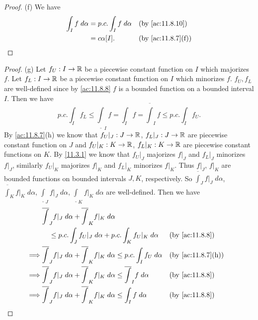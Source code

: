 \begin{proof}{(f)}
  We have
  \begin{align*}
    \int_I f \; d \alpha & = p.c. \int_I f \; d \alpha &  & \text{(by \cref{ac:11.8.10})}   \\
                         & = c \alpha[I].              &  & \text{(by \cref{ac:11.8.7}(f))}
  \end{align*}
\end{proof}

\begin{proof}{(g)}
  Let \(f_U : I \to \mathbb{R}\) be a piecewise constant function on \(I\) which majorizes \(f\).
  Let \(f_L : I \to \mathbb{R}\) be a piecewise constant function on \(I\) which minorizes \(f\).
  \(f_U, f_L\) are well-defined since by \cref{ac:11.8.8} \(f\) is a bounded function on a bounded interval \(I\).
  Then we have
  \[
    p.c. \int_I f_L \leq \underline{\int}_I f = \int_I f = \overline{\int}_I f \leq p.c. \int_I f_U.
  \]
  By \cref{ac:11.8.7}(h) we know that \(f_U|_J : J \to \mathbb{R}\), \(f_L|_J : J \to \mathbb{R}\) are piecewise constant function on \(J\) and \(f_U|_K : K \to \mathbb{R}\), \(f_L|_K : K \to \mathbb{R}\) are piecewise constant functions on \(K\).
  By \cref{11.3.1} we know that \(f_U|_J\) majorizes \(f|_J\) and \(f_L|_J\) minorizes \(f|_J\), similarly \(f_U|_K\) majorizes \(f|_K\) and \(f_L|_K\) minorizes \(f|_K\).
  Thus \(f|_J\), \(f|_K\) are bounded functions on bounded intervals \(J, K\), respectively.
  So \(\overline{\int}_J f|_J \; d \alpha\), \(\overline{\int}_K f|_K \; d \alpha\), \(\underline{\int}_J f|_J \; d \alpha\), \(\underline{\int}_K f|_K \; d \alpha\) are well-defined.
  Then we have
  \begin{align*}
             & \overline{\int}_J f|_J \; d \alpha + \overline{\int}_K f|_K \; d \alpha                                                                           \\
             & \quad \leq p.c. \int_J f_U|_J \; d \alpha + p.c. \int_K f_U|_K \; d \alpha                                   &  & \text{(by \cref{ac:11.8.8})}    \\
    \implies & \overline{\int}_J f|_J \; d \alpha + \overline{\int}_K f|_K \; d \alpha \leq p.c. \int_I f_U \; d \alpha     &  & \text{(by \cref{ac:11.8.7}(h))} \\
    \implies & \overline{\int}_J f|_J \; d \alpha + \overline{\int}_K f|_K \; d \alpha \leq \overline{\int}_I f \; d \alpha &  & \text{(by \cref{ac:11.8.8})}    \\
    \implies & \overline{\int}_J f|_J \; d \alpha + \overline{\int}_K f|_K \; d \alpha \leq \int_I f \; d \alpha            &  & \text{(by \cref{ac:11.8.8})}

\end{align*}
\end{proof}
